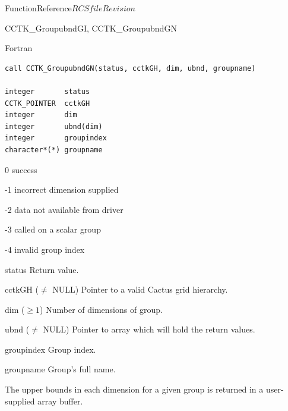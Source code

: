 \begin{cactuspart}{FunctionReference}{$RCSfile$}{$Revision$}
\begin{FunctionDescription}{CCTK\_GroupubndGI, CCTK\_GroupubndGN}
\begin{SynopsisSection}
\begin{Synopsis}{Fortran}
\begin{verbatim}
call CCTK_GroupubndGN(status, cctkGH, dim, ubnd, groupname)

integer       status
CCTK_POINTER  cctkGH
integer       dim
integer       ubnd(dim)
integer       groupindex
character*(*) groupname
\end{verbatim}
\end{Synopsis}
\end{SynopsisSection}

\begin{ResultSection}
\begin{Result}{\rm 0} success \end{Result}
\begin{Result}{\rm -1} incorrect dimension supplied \end{Result}
\begin{Result}{\rm -2} data not available from driver \end{Result}
\begin{Result}{\rm -3} called on a scalar group \end{Result}
\begin{Result}{\rm -4} invalid group index \end{Result}
\end{ResultSection}

\begin{ParameterSection}
\begin{Parameter}{status} Return value. \end{Parameter}
\begin{Parameter}{cctkGH ($\ne$ NULL)} Pointer to a valid Cactus grid hierarchy. \end{Parameter}
\begin{Parameter}{dim ($\ge 1$)} Number of dimensions of group. \end{Parameter}
\begin{Parameter}{ubnd ($\ne$ NULL)} Pointer to array which will hold the return values. \end{Parameter}
\begin{Parameter}{groupindex} Group index. \end{Parameter}
\begin{Parameter}{groupname} Group's full name. \end{Parameter}
\end{ParameterSection}

\begin{Discussion}
The upper bounds in each dimension for a given group is returned in a user-supplied array buffer.
\end{Discussion}


\end{FunctionDescription}
\end{cactuspart}
